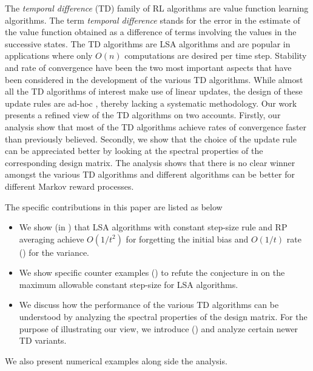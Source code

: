 The \emph{temporal difference} (TD) family of RL algorithms are value function learning algorithms. The term \emph{temporal difference} stands for the  error in the estimate of the value function obtained as a difference of terms involving the values in the successive states. The TD algorithms are LSA algorithms and are popular in applications where only $O(n)$ computations are desired per time step. Stability and rate of convergence have been the two most important aspects that have been considered in the development of the various TD algorithms. While almost all the TD algorithms of interest make use of linear updates, the design of these update rules are ad-hoc \cite{gtdfinite}, thereby lacking a systematic methodology. Our work presents a refined view of the TD algorithms on two accounts. Firstly, our analysis show that most of the TD algorithms achieve rates of convergence faster than previously believed. Secondly, we show that the choice of the update rule can be appreciated better by looking at the spectral properties of the corresponding design matrix. The analysis shows that there is no clear winner amongst the various TD algorithms and different algorithms can be better for different Markov reward processes.\par
The specific contributions in this paper are listed as below
\begin{itemize}[leftmargin=*] 
\item We show (in ) that LSA algorithms with constant step-size rule and RP averaging achieve $O(1/t^2)$ for forgetting the initial bias and $O(1/t)$ rate () for the variance.
\item We show specific counter examples () to refute the conjecture in \cite{bachaistats} on the maximum allowable constant step-size for LSA algorithms.
\item We discuss how the performance of the various TD algorithms can be understood by analyzing the spectral properties of the design matrix. For the purpose of illustrating our view, we introduce () and analyze certain newer TD variants.
\end{itemize}
We also present numerical examples along side the analysis.
